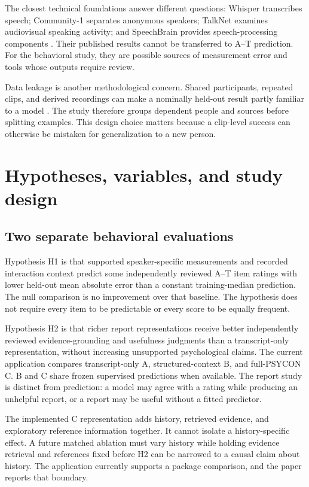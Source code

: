 \documentclass{article}
\begin{document}
The closest technical foundations answer different questions: Whisper transcribes speech; Community-1 separates anonymous speakers; TalkNet examines audiovisual speaking activity; and SpeechBrain provides speech-processing components \cite{tao2021,ravanelli2021}. Their published results cannot be transferred to A--T prediction. For the behavioral study, they are possible sources of measurement error and tools whose outputs require review.

Data leakage is another methodological concern. Shared participants, repeated clips, and derived recordings can make a nominally held-out result partly familiar to a model \cite{kapoor2022}. The study therefore groups dependent people and sources before splitting examples. This design choice matters because a clip-level success can otherwise be mistaken for generalization to a new person.

\section{Hypotheses, variables, and study design}
\subsection{Two separate behavioral evaluations}
Hypothesis H1 is that supported speaker-specific measurements and recorded interaction context predict some independently reviewed A--T item ratings with lower held-out mean absolute error than a constant training-median prediction. The null comparison is no improvement over that baseline. The hypothesis does not require every item to be predictable or every score to be equally frequent.

Hypothesis H2 is that richer report representations receive better independently reviewed evidence-grounding and usefulness judgments than a transcript-only representation, without increasing unsupported psychological claims. The current application compares transcript-only A, structured-context B, and full-PSYCON C. B and C share frozen supervised predictions when available. The report study is distinct from prediction: a model may agree with a rating while producing an unhelpful report, or a report may be useful without a fitted predictor.

The implemented C representation adds history, retrieved evidence, and exploratory reference information together. It cannot isolate a history-specific effect. A future matched ablation must vary history while holding evidence retrieval and references fixed before H2 can be narrowed to a causal claim about history. The application currently supports a package comparison, and the paper reports that boundary.
\end{document}
